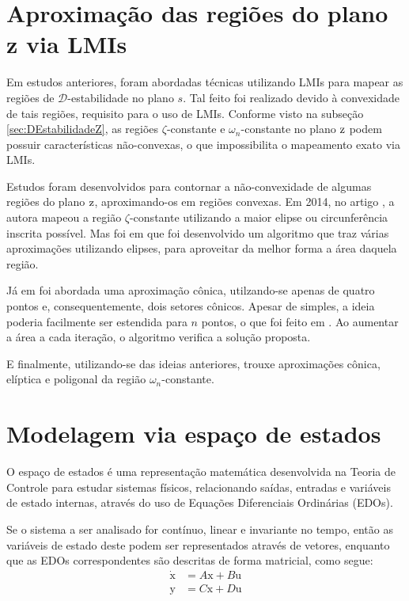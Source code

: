 \section{Aproximação das regiões do plano z via LMIs}
Em estudos anteriores, foram abordadas técnicas utilizando LMIs para mapear as regiões de $\mathscr{D}$-estabilidade no plano $s$. Tal feito foi realizado devido à convexidade de tais regiões, requisito para o uso de LMIs. Conforme visto na subseção \ref{sec:DEstabilidadeZ}, as regiões $\zeta$-constante e $\omega_n$-constante no plano $\operatorname{\mathrm{z}}$ podem possuir características não-convexas, o que impossibilita o mapeamento exato via LMIs.

Estudos foram desenvolvidos para contornar a não-convexidade de algumas regiões do plano $\operatorname{\mathrm{z}}$, aproximando-os em regiões convexas. Em 2014, no artigo \cite{ROSINOVA2014}, a autora mapeou a região $\zeta$-constante utilizando a maior elipse ou circunferência inscrita possível. Mas foi em \cite{ROSINOVA2019} que foi desenvolvido um algoritmo que traz várias aproximações utilizando elipses, para aproveitar da melhor forma a área daquela região.

Já em \cite{WISNIEWSKI2017} foi abordada uma aproximação cônica, utilzando-se apenas de quatro pontos e, consequentemente, dois setores cônicos. Apesar de simples, a ideia poderia facilmente ser estendida para $n$ pontos, o que foi feito em \cite{WISNIEWSKI2019}. Ao aumentar a área a cada iteração, o algoritmo verifica a solução proposta.

E finalmente, utilizando-se das ideias anteriores, \cite{CHIQUETO2021} trouxe aproximações cônica, elíptica e poligonal da região $\omega_n$-constante.

\section{Modelagem via espaço de estados}
O espaço de estados é uma representação matemática desenvolvida na Teoria de Controle para estudar sistemas físicos, relacionando saídas, entradas e variáveis de estado internas, através do uso de Equações Diferenciais Ordinárias (EDOs).

Se o sistema a ser analisado for contínuo, linear e invariante no tempo, então as variáveis de estado deste podem ser representados através de vetores, enquanto que as EDOs correspondentes são descritas de forma matricial, como segue:
\begin{subequations}
  \label{eq:SSC}
  \begin{align}
    \dot{\pmb{\mathrm{x}}} &= A\pmb{\mathrm{x}} + B\pmb{\mathrm{u}}\label{eq:SSCEntrada}\\
    \pmb{\mathrm{y}} &= C\pmb{\mathrm{x}} + D\pmb{\mathrm{u}}\label{eq:SSCSaida}
  \end{align}
\end{subequations}

